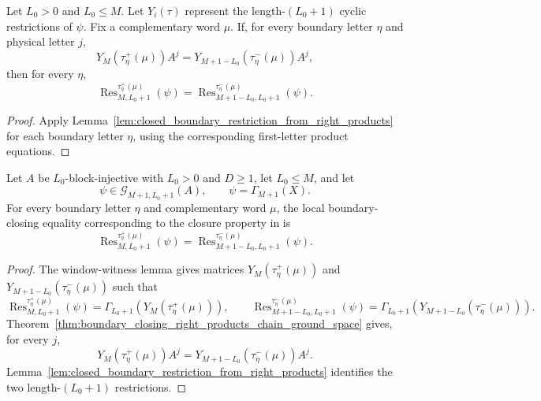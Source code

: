 \begin{lemma}
    \label{lem:closed_boundary_restrictions_from_first_letter_products}
    \leanok
    Let \(L_0>0\) and \(L_0\le M\). Let \(Y_i(\tau)\) represent the
    length-\((L_0+1)\) cyclic restrictions of \(\psi\). Fix a complementary
    word \(\mu\). If, for every boundary letter \(\eta\) and physical letter
    \(j\),
    \[
        Y_M(\tau^+_\eta(\mu))A^j
        =
        Y_{M+1-L_0}(\tau^-_\eta(\mu))A^j,
    \]
    then for every \(\eta\),
    \[
        \operatorname{Res}^{\tau^+_\eta(\mu)}_{M,L_0+1}(\psi)
        =
        \operatorname{Res}^{\tau^-_\eta(\mu)}_{M+1-L_0,L_0+1}(\psi).
    \]
\end{lemma}

\begin{proof}
    \leanok
    Apply Lemma~\ref{lem:closed_boundary_restriction_from_right_products} for
    each boundary letter \(\eta\), using the corresponding first-letter product
    equations.
\end{proof}

\begin{lemma}
    \label{lem:closure_property_boundary_restriction_chain_ground_space}
    \leanok
    Let $A$ be $L_0$-block-injective with $L_0>0$ and $D\ge1$, let
    $L_0\le M$, and let
    \[
        \psi\in\mathcal G_{M+1,L_0+1}(A),
        \qquad
        \psi=\Gamma_{M+1}(X).
    \]
    For every boundary letter $\eta$ and complementary word $\mu$, the local
    boundary-closing equality corresponding to the closure property in
    \cite[lines~2078--2079]{Cirac2021Matrix} is
    \[
        \operatorname{Res}^{\tau^+_{\eta}(\mu)}_{M,L_0+1}(\psi)
        =
        \operatorname{Res}^{\tau^-_{\eta}(\mu)}_{M+1-L_0,L_0+1}(\psi).
    \]
\end{lemma}

\begin{proof}
    \notready
    The window-witness lemma gives matrices
    \(Y_M(\tau^+_\eta(\mu))\) and
    \(Y_{M+1-L_0}(\tau^-_\eta(\mu))\) such that
    \[
        \operatorname{Res}^{\tau^+_\eta(\mu)}_{M,L_0+1}(\psi)
        =
        \Gamma_{L_0+1}\!\left(Y_M(\tau^+_\eta(\mu))\right),
        \qquad
        \operatorname{Res}^{\tau^-_\eta(\mu)}_{M+1-L_0,L_0+1}(\psi)
        =
        \Gamma_{L_0+1}\!\left(Y_{M+1-L_0}(\tau^-_\eta(\mu))\right).
    \]
    Theorem~\ref{thm:boundary_closing_right_products_chain_ground_space}
    gives, for every $j$,
    \[
        Y_M(\tau^+_\eta(\mu))A^j
        =
        Y_{M+1-L_0}(\tau^-_\eta(\mu))A^j .
    \]
    Lemma~\ref{lem:closed_boundary_restriction_from_right_products} identifies
    the two length-$(L_0+1)$ restrictions.
\end{proof}

